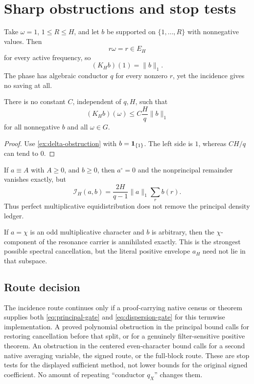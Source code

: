 \section{Sharp obstructions and stop tests}
\label{sec:sharp-obstructions}

\begin{example}
\label{ex:delta-obstruction}
Take \(\omega=1\), \(1\le R\le H\), and let \(b\) be supported on
\(\{1,\ldots,R\}\) with nonnegative values.  Then
\[
 r\omega=r\in E_H
\]
for every active frequency, so
\[
 (K_Hb)(1)=\|b\|_1.
\]
The phase has algebraic conductor \(q\) for every nonzero \(r\), yet
the incidence gives no saving at all.
\end{example}

\begin{proposition}
\label{prop:no-conductor-only}
There is no constant \(C\), independent of \(q,H\), such that
\[
 (K_Hb)(\omega)
 \le C\frac{H}{q}\|b\|_1
\]
for all nonnegative \(b\) and all \(\omega\in G\).
\end{proposition}

\begin{proof}
Use \cref{ex:delta-obstruction} with \(b=\mathbf 1_{\{1\}}\).  The left
side is \(1\), whereas \(CH/q\) can tend to \(0\).
\end{proof}

\begin{example}
\label{ex:principal-concentration}
If \(a\equiv A\) with \(A\ge0\), and \(b\ge0\), then
\(a^\circ=0\) and the
nonprincipal remainder vanishes exactly, but
\[
 \mathcal I_H(a,b)
 =\frac{2H}{q-1}
 \|a\|_1\sum_rb(r).
\]
Thus perfect multiplicative equidistribution does not remove the
principal density ledger.
\end{example}

\begin{example}
\label{ex:odd-null}
If \(a=\chi\) is an odd multiplicative character and \(b\) is
arbitrary, then the \(\chi\)-component of the resonance carrier is
annihilated exactly.  This is the strongest possible spectral
cancellation, but the literal positive envelope \(a_H\) need not
lie in that subspace.
\end{example}

\subsection{Route decision}

The incidence route continues only if a proof-carrying native census
or theorem supplies both \eqref{eq:principal-gate} and
\eqref{eq:dispersion-gate} for this termwise implementation.  A
proved polynomial obstruction in the principal bound calls for
restoring cancellation before that split, or for a genuinely
filter-sensitive positive theorem.  An obstruction in the centered
even-character bound calls for a second native averaging variable,
the signed route, or the full-block route.  These are stop tests for
the displayed sufficient method, not lower bounds for the original
signed coefficient.  No amount of repeating ``conductor \(q_X\)''
changes them.
